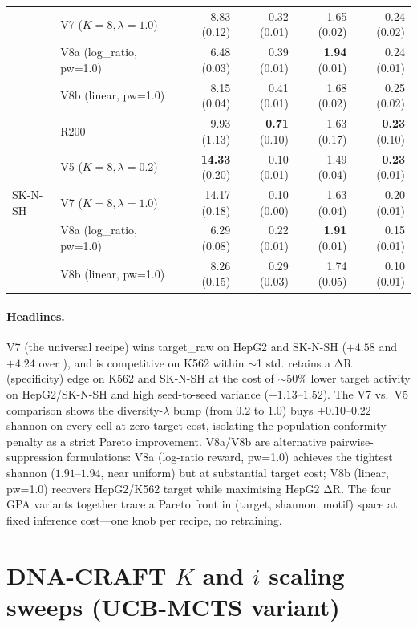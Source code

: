 \begin{table}[h]
\begin{tabular}{llrrrr}
 & \gpa{} V7 ($K\!=\!8, \lambda\!=\!1.0$) & 8.83 (0.12) & 0.32 (0.01) & 1.65 (0.02) & 0.24 (0.02) \\
 & \gpa{} V8a (log\_ratio, pw=1.0) & 6.48 (0.03) & 0.39 (0.01) & \textbf{1.94} (0.01) & 0.24 (0.01) \\
 & \gpa{} V8b (linear, pw=1.0) & 8.15 (0.04) & 0.41 (0.01) & 1.68 (0.02) & 0.25 (0.02) \\
\midrule
\multirow{5}{*}{SK-N-SH}
 & \ctrldna{} R200             & 9.93 (1.13) & \textbf{0.71} (0.10) & 1.63 (0.17) & \textbf{0.23} (0.10) \\
 & \gpa{} V5 ($K\!=\!8, \lambda\!=\!0.2$) & \textbf{14.33} (0.20) & 0.10 (0.01) & 1.49 (0.04) & \textbf{0.23} (0.01) \\
 & \gpa{} V7 ($K\!=\!8, \lambda\!=\!1.0$) & 14.17 (0.18) & 0.10 (0.00) & 1.63 (0.04) & 0.20 (0.01) \\
 & \gpa{} V8a (log\_ratio, pw=1.0) & 6.29 (0.08) & 0.22 (0.01) & \textbf{1.91} (0.01) & 0.15 (0.01) \\
 & \gpa{} V8b (linear, pw=1.0) & 8.26 (0.15) & 0.29 (0.03) & 1.74 (0.05) & 0.10 (0.01) \\
\bottomrule
\end{tabular}
\end{table}

\paragraph{Headlines.}
\gpa{} V7 (the universal recipe) wins target\_raw on HepG2 and SK-N-SH ($+4.58$ and $+4.24$ over \ctrldna{}), and is competitive on K562 within $\sim$1 std. \ctrldna{} retains a ΔR (specificity) edge on K562 and SK-N-SH at the cost of $\sim$50\% lower target activity on HepG2/SK-N-SH and high seed-to-seed variance ($\pm 1.13$--$1.52$). The V7 vs.\ V5 comparison shows the diversity-$\lambda$ bump (from $0.2$ to $1.0$) buys $+0.10$--$0.22$ shannon on every cell at zero target cost, isolating the population-conformity penalty as a strict Pareto improvement. V8a/V8b are alternative pairwise-suppression formulations: V8a (log-ratio reward, pw=1.0) achieves the tightest shannon ($1.91$--$1.94$, near uniform) but at substantial target cost; V8b (linear, pw=1.0) recovers HepG2/K562 target while maximising HepG2 ΔR. The four GPA variants together trace a Pareto front in (target, shannon, motif) space at fixed inference cost---one knob per recipe, no retraining.

\section{DNA-CRAFT $K$ and $i$ scaling sweeps (UCB-MCTS variant)}\label{app:ucb_scaling}

